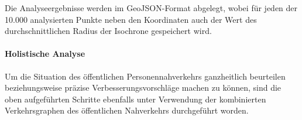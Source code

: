 Die Analyseergebnisse werden im GeoJSON-Format abgelegt, wobei für jeden der 10.000 analysierten Punkte neben den Koordinaten auch der Wert des durchschnittlichen Radius der Isochrone gespeichert wird.

\paragraph*{Holistische Analyse}
\label{holistische_analyse}

Um die Situation des öffentlichen Personennahverkehrs ganzheitlich beurteilen beziehungsweise präzise Verbesserungsvorschläge machen zu können, sind die oben aufgeführten Schritte ebenfalls unter Verwendung der kombinierten Verkehrsgraphen des öffentlichen Nahverkehrs durchgeführt worden.